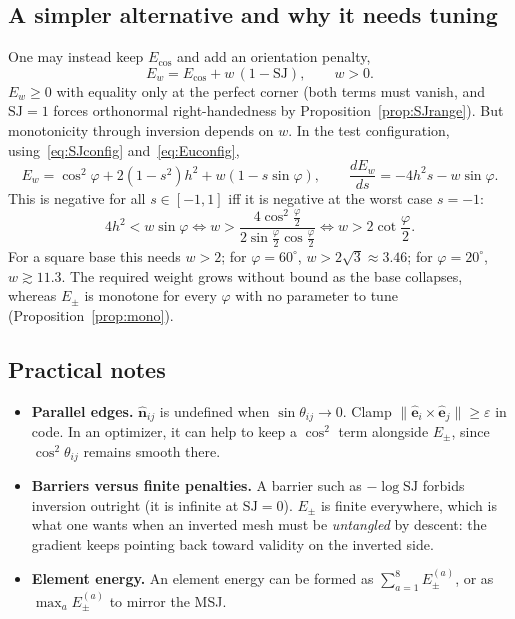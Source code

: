 \documentclass[11pt]{article}
\theoremstyle{definition}
\theoremstyle{remark}
\newcommand{\uv}[1]{\hat{\bm{#1}}}
\newcommand{\Es}{E_{\pm}}
\newcommand{\Eu}{E_{\cos}}
\newcommand{\SJ}{\mathrm{SJ}}
\begin{document}
\subsection{A simpler alternative and why it needs tuning}

One may instead keep $\Eu$ and add an orientation penalty,
\begin{equation}
  E_w=\Eu+w\,(1-\SJ),\qquad w>0.
\end{equation}
$E_w\ge0$ with equality only at the perfect corner (both terms must vanish, and $\SJ=1$ forces
orthonormal right-handedness by Proposition~\ref{prop:SJrange}). But monotonicity through
inversion depends on $w$. In the test configuration, using~\eqref{eq:SJconfig} and~\eqref{eq:Euconfig},
\begin{equation}
  E_w=\cos^2\varphi+2(1-s^2)h^2+w(1-s\sin\varphi),\qquad
  \frac{dE_w}{ds}=-4h^2s-w\sin\varphi.
\end{equation}
This is negative for all $s\in[-1,1]$ iff it is negative at the worst case $s=-1$:
\begin{equation}
  4h^2<w\sin\varphi
  \iff w>\frac{4\cos^2\frac{\varphi}{2}}{2\sin\frac{\varphi}{2}\cos\frac{\varphi}{2}}
  \iff \boxed{w>2\cot\frac{\varphi}{2}.}
\end{equation}
For a square base this needs $w>2$; for $\varphi=60^\circ$, $w>2\sqrt3\approx3.46$; for
$\varphi=20^\circ$, $w\gtrsim11.3$. The required weight grows without bound as the base collapses,
whereas $\Es$ is monotone for every $\varphi$ with no parameter to tune (Proposition~\ref{prop:mono}).

\subsection{Practical notes}

\begin{itemize}
  \item \textbf{Parallel edges.} $\uv{n}_{ij}$ is undefined when $\sin\theta_{ij}\to0$. Clamp
        $\|\uv{e}_i\times\uv{e}_j\|\ge\varepsilon$ in code. In an optimizer, it can help to keep a
        $\cos^2$ term alongside $\Es$, since $\cos^2\theta_{ij}$ remains smooth there.
  \item \textbf{Barriers versus finite penalties.} A barrier such as $-\log\SJ$ forbids inversion
        outright (it is infinite at $\SJ=0$). $\Es$ is finite everywhere, which is what one wants when
        an inverted mesh must be \emph{untangled} by descent: the gradient keeps pointing back toward
        validity on the inverted side.
  \item \textbf{Element energy.} An element energy can be formed as $\sum_{a=1}^{8}\Es^{(a)}$, or as
        $\max_a\Es^{(a)}$ to mirror the MSJ.
\end{itemize}
\end{document}
